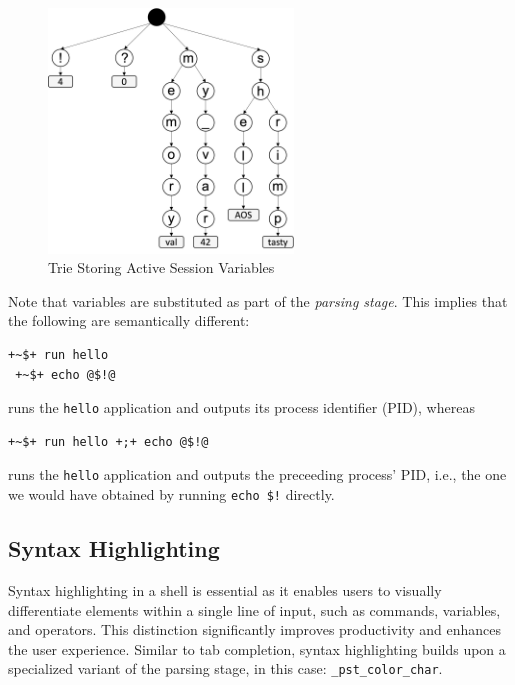 \begin{figure}[htp]
    \centering
    \includegraphics[width=6.5cm]{images/shell/var_trie.png}
    \caption{Trie Storing Active Session Variables}
    \label{fig:shell_var_trie}
\end{figure}

Note that variables are substituted as part of the \emph{parsing stage}. This implies that the following are semantically different:

 \begin{lstlisting}[style=ShellInputStyle]
 +~$+ run hello
 +~$+ echo @$!@
\end{lstlisting}

runs the \texttt{hello} application and outputs its process identifier (PID), whereas

 \begin{lstlisting}[style=ShellInputStyle]
 +~$+ run hello +;+ echo @$!@
\end{lstlisting}

runs the \texttt{hello} application and outputs the preceeding process' PID, i.e., the one we would have obtained by running \texttt{echo \$!} directly.

\subsection{Syntax Highlighting}\label{sec:shell_syntax_highlighting}

Syntax highlighting in a shell is essential as it enables users to visually differentiate elements within a single line of input, such as commands, variables, and operators. This distinction significantly improves productivity and enhances the user experience. Similar to tab completion, syntax highlighting builds upon a specialized variant of the parsing stage, in this case: \texttt{\_pst\_color\_char}.


